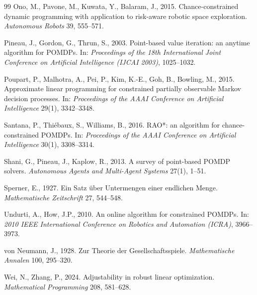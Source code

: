 \begin{thebibliography}{99}
 Ono, M., Pavone, M., Kuwata, Y., Balaram, J., 2015. Chance-constrained dynamic programming with application to risk-aware robotic space exploration. \emph{Autonomous Robots} 39, 555--571.

 Pineau, J., Gordon, G., Thrun, S., 2003. Point-based value iteration: an anytime algorithm for POMDPs. In: \emph{Proceedings of the 18th International Joint Conference on Artificial Intelligence (IJCAI 2003)}, 1025--1032.

 Poupart, P., Malhotra, A., Pei, P., Kim, K.-E., Goh, B., Bowling, M., 2015. Approximate linear programming for constrained partially observable Markov decision processes. In: \emph{Proceedings of the AAAI Conference on Artificial Intelligence} 29(1), 3342--3348.

 Santana, P., Thi\'ebaux, S., Williams, B., 2016. RAO*: an algorithm for chance-constrained POMDPs. In: \emph{Proceedings of the AAAI Conference on Artificial Intelligence} 30(1), 3308--3314.

 Shani, G., Pineau, J., Kaplow, R., 2013. A survey of point-based POMDP solvers. \emph{Autonomous Agents and Multi-Agent Systems} 27(1), 1--51.

 Sperner, E., 1927. Ein Satz \"uber Untermengen einer endlichen Menge. \emph{Mathematische Zeitschrift} 27, 544--548.

 Undurti, A., How, J.P., 2010. An online algorithm for constrained POMDPs. In: \emph{2010 IEEE International Conference on Robotics and Automation (ICRA)}, 3966--3973.

 von Neumann, J., 1928. Zur Theorie der Gesellschaftsspiele. \emph{Mathematische Annalen} 100, 295--320.

 Wei, N., Zhang, P., 2024. Adjustability in robust linear optimization. \emph{Mathematical Programming} 208, 581--628.

\end{thebibliography}


